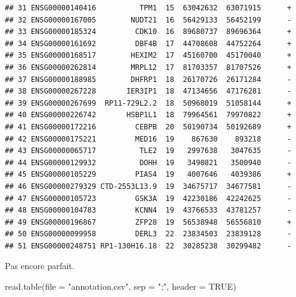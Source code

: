 \documentclass[
]{book}
\newenvironment{Shaded}{\begin{snugshade}}{\end{snugshade}}
\newcommand{\AttributeTok}[1]{\textcolor[rgb]{0.77,0.63,0.00}{#1}}
\newcommand{\ConstantTok}[1]{\textcolor[rgb]{0.00,0.00,0.00}{#1}}
\newcommand{\FunctionTok}[1]{\textcolor[rgb]{0.00,0.00,0.00}{#1}}
\newcommand{\NormalTok}[1]{#1}
\newcommand{\StringTok}[1]{\textcolor[rgb]{0.31,0.60,0.02}{#1}}
\begin{document}
\begin{verbatim}
## 31 ENSG00000140416          TPM1  15  63042632  63071915      +
## 32 ENSG00000167005        NUDT21  16  56429133  56452199      -
## 33 ENSG00000185324         CDK10  16  89680737  89696364      +
## 34 ENSG00000161692         DBF4B  17  44708608  44752264      +
## 35 ENSG00000168517        HEXIM2  17  45160700  45170040      +
## 36 ENSG00000262814        MRPL12  17  81703357  81707526      +
## 37 ENSG00000188985        DHFRP1  18  26170726  26171284      -
## 38 ENSG00000267228       IER3IP1  18  47134656  47176281      -
## 39 ENSG00000267699  RP11-729L2.2  18  50968019  51058144      +
## 40 ENSG00000226742       HSBP1L1  18  79964561  79970822      +
## 41 ENSG00000172216         CEBPB  20  50190734  50192689      +
## 42 ENSG00000175221         MED16  19    867630    893218      -
## 43 ENSG00000065717          TLE2  19   2997638   3047635      -
## 44 ENSG00000129932          DOHH  19   3490821   3500940      -
## 45 ENSG00000105229         PIAS4  19   4007646   4039386      +
## 46 ENSG00000279329 CTD-2553L13.9  19  34675717  34677581      -
## 47 ENSG00000105723         GSK3A  19  42230186  42242625      -
## 48 ENSG00000104783         KCNN4  19  43766533  43781257      -
## 49 ENSG00000196867         ZFP28  19  56538948  56556810      +
## 50 ENSG00000099958         DERL3  22  23834503  23839128      -
## 51 ENSG00000248751 RP1-130H16.18  22  30285238  30299482      -
\end{verbatim}

Pas encore parfait.

\begin{Shaded}
\begin{Highlighting}[]
\FunctionTok{read.table}\NormalTok{(}\AttributeTok{file =} \StringTok{"annotation.csv"}\NormalTok{, }\AttributeTok{sep =} \StringTok{";"}\NormalTok{, }\AttributeTok{header =} \ConstantTok{TRUE}\NormalTok{)}
\end{Highlighting}
\end{Shaded}
\end{document}
